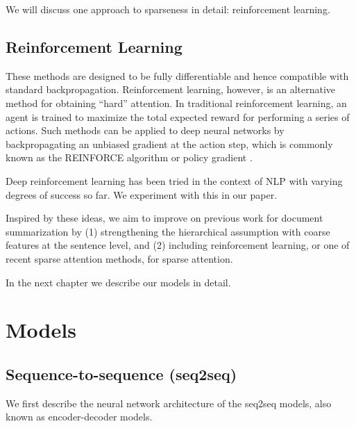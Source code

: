 \documentclass[11pt]{report}
\begin{document}
We will discuss one approach to sparseness in detail: reinforcement learning.

\section{Reinforcement Learning}

These methods are designed to be fully differentiable and hence compatible with standard backpropagation. Reinforcement learning, however, is an alternative method for obtaining ``hard'' attention. In traditional reinforcement learning, an agent is trained to maximize the total expected reward for performing a series of actions. Such methods can be applied to deep neural networks by backpropagating an unbiased gradient at the action step, which is commonly known as the REINFORCE algorithm or policy gradient \citep{williams1992reinforce, schulman2015backprop}.



Deep reinforcement learning has been tried in the context of NLP \citep{zaremba2015rlntm, ranzato2015, li2016dialogueRL} with varying degrees of success so far. We experiment with this in our paper.


Inspired by these ideas, we aim to improve on previous work for document summarization by (1) strengthening the hierarchical assumption with coarse features at the sentence level, and (2) including reinforcement learning, or one of recent sparse attention methods, for sparse attention.

In the next chapter we describe our models in detail.



\chapter{Models}

\section{Sequence-to-sequence (seq2seq)}

We first describe the neural network architecture of the seq2seq models, also known as encoder-decoder models.
\end{document}
